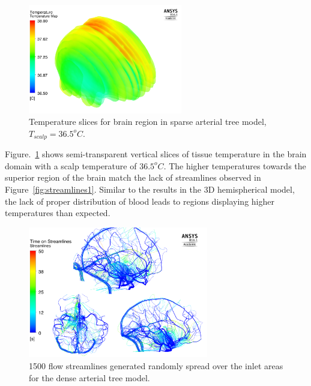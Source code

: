\documentclass[11pt,english,a4paper,twoside,openright]{report}
\begin{document}
{{{{{{{{\begin{figure}[h]
	\centering
	\includegraphics[width=0.6\textwidth]{3DFullVessels/temperatureVolume1}
	\caption[Temperature slices for brain region in sparse arterial tree model, $T_{scalp}=36.5^{o}C$]{Temperature slices for brain region in sparse arterial tree model, $T_{scalp}=36.5^{o}C$.}
	\label{fig:temperatureVolume1}
\end{figure}

Figure.~\ref{fig:temperatureVolume1} shows semi-transparent vertical slices of tissue temperature in the brain domain with a scalp temperature of $36.5^{o}C$. The higher temperatures towards the superior region of the brain match the lack of streamlines observed in Figure~\ref{fig:streamlines1}. Similar to the results in the 3D hemispherical model, the lack of proper distribution of blood leads to regions displaying higher temperatures than expected.

\begin{figure}[h]
	\centering
	\includegraphics[width=0.7\textwidth]{3DFullVessels/streamlines}
	\caption[1500 flow streamlines generated randomly spread over the inlet areas for the dense arterial tree model]{1500 flow streamlines generated randomly spread over the inlet areas for the dense arterial tree model.}
	\label{fig:streamlines2}
\end{figure}

}}}}}}}}
\end{document}
